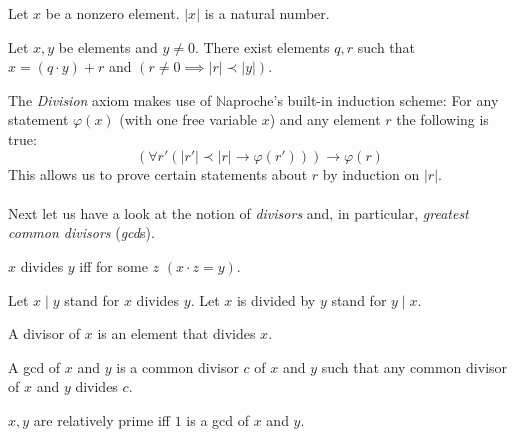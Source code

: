 \documentclass{article}
\begin{document}
  \begin{forthel}
    \begin{signature}[EucSort]
      Let $x$ be a nonzero element. $|x|$ is a natural number.
    \end{signature}

    \begin{axiom}[Division]
      Let $x,y$ be elements and $y \neq 0$. There exist elements $q,r$ such that $x = (q \cdot y) + r$ and $(r \neq 0 \implies |r| \prec |y|)$.
    \end{axiom}
  \end{forthel}

  The \textit{Division} axiom makes use of {$\mathbb{N}$aproche's} built-in induction scheme: For any statement $\varphi(x)$ (with one free variable $x$) and any element $r$ the following is true:
  $$ (\forall r' (|r'| \prec |r| \rightarrow \varphi(r'))) \rightarrow \varphi(r)$$
  This allows us to prove certain statements about $r$ by induction on $|r|$.

  \paragraph{} Next let us have a look at the notion of \textit{divisors} and, in particular, \textit{greatest common divisors} (\textit{gcd}s).

  \begin{forthel}

    \begin{definition}[DefDiv]
      $x$ divides $y$ iff for some $z$ $(x \cdot z = y)$.
    \end{definition}

    Let $x \mid y$ stand for $x$ divides $y$.
    Let $x$ is divided by $y$ stand for $y \mid x$.

    \begin{definition}[DefDvs]
      A divisor of $x$ is an element that divides $x$.
    \end{definition}

    \begin{definition}[DefGCD]
      A gcd of $x$ and $y$ is a common divisor $c$ of $x$ and $y$ such that any common divisor of $x$ and $y$ divides $c$.
    \end{definition}

    \begin{definition}[DefRel]
      $x,y$ are relatively prime iff $1$ is a gcd of $x$ and $y$.
    \end{definition}
  \end{forthel}
\end{document}
